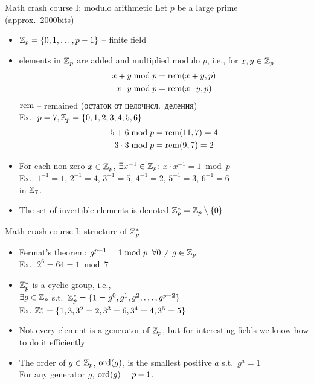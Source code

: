 \documentclass[usenames,dvipsnames, 9pt]{beamer}
\begin{document}


\begin{frame}{Math crash course I: modulo arithmetic}
	\Large 
	{\color{Orange} Let $p$ be a large prime (approx.\ 2000bits)}
	\begin{itemize}
		\item ${{\mathbb Z}}_p = \left\{ 0, 1, \ldots, p-1 \right\}$ -- finite field 
		\pause
		\item elements in ${{\mathbb Z}}_p$ are added and multiplied modulo $p$, i.e., for $x, y \in {{\mathbb Z}}_p$
	\begin{align*}
			x+y \bmod p &= \mathrm{rem}(x+y, p) \\
			x\cdot y \bmod p &= \mathrm{rem}(x\cdot y, p)
	\end{align*}
	{\large $\mathrm{rem} $ -- remained (остаток от целочисл.\ деления)}\\
	\pause
	Ex.: $p  = 7, {{\mathbb Z}}_p = \{0, 1, 2, 3, 4, 5, 6\}$
	\begin{align*}
	5+6 \bmod p &= \mathrm{rem}(11, 7) = 4 \\
	3\cdot 3  \bmod p &= \mathrm{rem}(9, 7) = 2
	\end{align*}
	\pause
	\item For each non-zero $x \in {{\mathbb Z}}_p$, $\exists x^{-1} \in {{\mathbb Z}}_p$: $x \cdot x^{-1} = 1 \bmod p$\\
	Ex.:  $1^{-1} = 1$, $2^{-1} = 4$, $3^{-1} = 5$,  $4^{-1} = 2$, $5^{-1} = 3$, $6^{-1} = 6$\\  in ${{\mathbb Z}}_7$.
	\item The set of invertible elements is denoted ${{\mathbb Z}}_p^{\ast} = {{\mathbb Z}}_p \setminus \{0\}$
	\end{itemize}

\end{frame}

\begin{frame}{Math crash course I: structure of ${{\mathbb Z}}_p^\ast$ }
\Large
\begin{itemize}
	\itemsep 10pt
	\item {\color{Orange} Fermat's theorem:} $g^{p-1} = 1 \bmod p \; \; \forall 0 \neq g \in {{\mathbb Z}}_p$\\
	Ex.: $2^6 = 64 = 1 \bmod 7$
	\item ${{\mathbb Z}}_p^\ast$ is a {\color{Orange} cyclic group}, i.e., \\
	$\exists g \in {{\mathbb Z}}_p$ s.t.\ ${{\mathbb Z}}_p^\ast = \{1 = g^0, g^1, g^2, \ldots, g^{p-2}\}$ \\
	Ex. ${{\mathbb Z}}_7^\ast = \{1, 3, 3^2 = 2, 3^3 = 6, 3^4 = 4, 3^5 = 5\}$ 
	\pause
	\item Not every element is a generator of  ${{\mathbb Z}}_p$, but for interesting fields we know how to do it efficiently
	\pause
	\item The {\color{Orange} order} of $g \in {{\mathbb Z}}_p$, $\mathrm{ord}(g)$, is the {\color{Orange} smallest} positive $a$ s.t.\ $g^a = 1$ \\
	For any generator $g$, $\mathrm{ord}(g) = p-1$.
\end{itemize}
\end{frame}
\end{document}
